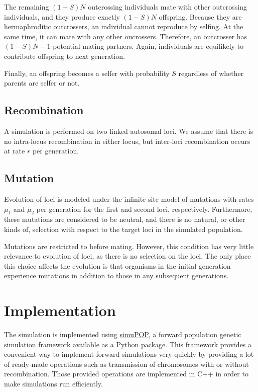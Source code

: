 \documentclass[12pt]{article}
\begin{document}
The remaining \((1 - S)N\) outcrossing individuals mate with other
outcrossing individuals, and they produce exactly \((1 - S)N\) offspring.
Because they are hermaphroditic outcrossers, an individual cannot
reproduce by selfing.
At the same time, it can mate with any other oucrossers.
Therefore, an outcrosser has \((1 - S) N - 1\) potential mating
partners.
Again, individuals are equilikely to contribute offspring to next
generation.

Finally, an offspring becomes a selfer with probability \(S\)
regardless of whether parents are selfer or not.

\subsection{Recombination}
\label{sec:recombination}

A simulation is performed on two linked autosomal loci.
We assume that there is no intra-locus recombination in either locus,
but inter-loci recombination occurs at rate \(r\) per generation.

\subsection{Mutation}
\label{sec:mutation}

Evolution of loci is modeled under the infinite-site model of
mutations with rates \(\mu_{1}\) and \(\mu_{2}\) per generation
for the first and second loci, respectively.
Furthermore, these mutations are considered to be neutral, and there
is no natural, or other kinds of, selection with respect to the target
loci in the simulated population.

Mutations are restricted to before mating.  However, this condition has
very little relevance to evolution of loci, as there is no selection
on the loci.
The only place this choice affects the evolution is that organisms in
the initial generation experience mutations in addition to those in
any subsequent generations.

\section{Implementation}
\label{sec:implementation}

The simulation is implemented using
\href{http://simupop.sourceforge.net/}{simuPOP}, a forward population
genetic simulation framework available as a Python package.
This framework provides a convenient way to implement forward
simulations very quickly by providing a lot of ready-made operations
such as transmission of chromosomes with or without recombination.
Those provided operations are implemented in C++ in order to make
simulations run efficiently.
\end{document}
